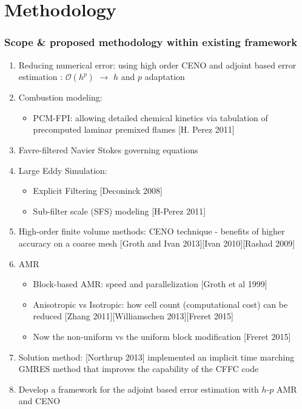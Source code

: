 \documentclass{beamer}
\begin{document}
\section[Methodology]{Methodology}
\begin{frame}%
\frametitle{Scope \& proposed methodology within existing framework}
\scriptsize
\vspace{-10pt}
\begin{enumerate}[1.]
\item Reducing numerical error: using high order CENO and adjoint based error estimation : {$\mathcal{O}(h^p)$} $\rightarrow$ $h$ and $p$ adaptation

\item Combustion modeling:
  \begin{itemize}
   \tiny
   \item PCM-FPI: allowing detailed chemical kinetics via tabulation of precomputed laminar premixed flames [H. Perez 2011]
   \end{itemize}  


\item Favre-filtered Navier Stokes governing equations

\item Large Eddy Simulation:
  \begin{itemize}
  \tiny
   \item Explicit Filtering [Deconinck 2008]
   \item Sub-filter scale (SFS) modeling [H-Perez 2011]
  \end{itemize}

\item High-order finite volume methods: CENO technique - benefits of higher accuracy on a coarse mesh [Groth and Ivan 2013][Ivan 2010][Rashad 2009]


\item AMR
   \begin{itemize}
   \tiny
   \item Block-based AMR: speed and parallelization [Groth et al 1999]
   \item Anisotropic vs Isotropic: how cell count (computational cost) can be reduced [Zhang 2011][Williamschen 2013][Freret 2015]
   \item Now the non-uniform vs the uniform block modification [Freret 2015]
   \end{itemize}
   
\item Solution method: [Northrup 2013] implemented an implicit time marching GMRES method that improves the capability of the CFFC code   
   
\item Develop a framework for the adjoint based error estimation with $h$-$p$ AMR and CENO
\end{enumerate}
\end{frame}
\end{document}
